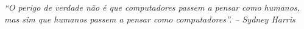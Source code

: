 %
%

\begin{epigrafe}

\textit{“O perigo de verdade não é que computadores passem a pensar como humanos, mas sim que humanos passem a pensar como computadores”. -- Sydney Harris}

\end{epigrafe}
